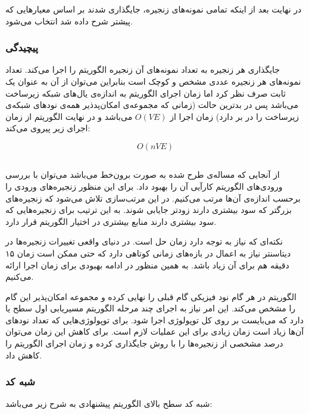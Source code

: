 در نهایت بعد از اینکه تمامی نمونه‌های زنجیره، جایگذاری شدند  بر اساس معیارهایی که پیشتر شرح داده شد انتخاب می‌شود.

\subsubsection{پیچیدگی}

جایگذاری هر زنجیره به تعداد نمونه‌های آن زنجیره الگوریتم  را اجرا می‌کند.
تعداد نمونه‌های هر زنجیره عددی مشخص و کوچک است بنابراین می‌توان از آن به عنوان یک ثابت صرف نظر کرد
اما زمان اجرای الگوریتم  به اندازه‌ی یال‌های شبکه زیرساخت می‌باشد
پس در بدترین حالت (زمانی که مجموعه‌ی امکان‌پدذیر همه‌ی نودهای شبکه‌ی زیرساخت را در بر دارد)‌ زمان اجرا از
\(O(VE)\)
می‌باشد و در نهایت الگوریتم از زمان اجرای زیر پیروی می‌کند:

$$
O(nVE)
$$

\subsection{}

از آنجایی که مساله‌ی طرح شده به صورت برون‌خط می‌باشد می‌توان با بررسی ورودی‌های الگوریتم کارآیی آن را بهبود داد.
برای این منظور زنجیره‌های ورودی را برحسب اندازه‌ی آن‌ها مرتب می‌کنیم.
در این مرتب‌سازی تلاش می‌شود که زنجیره‌های بزرگتر که سود بیشتری دارند زودتر جایابی شوند.
به این ترتیب برای زنجیره‌هایی که سود بیشتری دارند منابع بیشتری در اختیار الگوریتم قرار دارد.

نکته‌ای که نیاز به توجه دارد زمان حل است. در دنیای واقعی تغییرات زنجیره‌ها در دیتاسنتر نیاز به اعمال در بازه‌های زمانی کوتاهی دارد که
حتی ممکن است زمان ۱۵ دقیقه هم برای آن زیاد باشد.
به همین منظور در ادامه بهبودی برای زمان اجرا ارائه می‌کنیم.

الگوریتم  در هر گام نود فیزیکی گام قبلی را نهایی کرده و مجموعه امکان‌پذیر این گام را مشخص می‌کند.
این امر نیاز به اجرای چند مرحله الگوریتم مسیریابی اول سطح یا  دارد که
می‌بایست بر روی کل توپولوژی اجرا شود.
برای توپولوژی‌هایی که تعداد نودهای آن‌ها زیاد است زمان زیادی برای این عملیات لازم است.
برای کاهش این زمان می‌توان درصد مشخصی از زنجیره‌ها را با روش  جایگذاری کرده و زمان اجرای الگوریتم را کاهش داد.

\subsubsection{شبه کد}

شبه کد سطح بالای الگوریتم پیشنهادی به شرح زیر می‌باشد:

